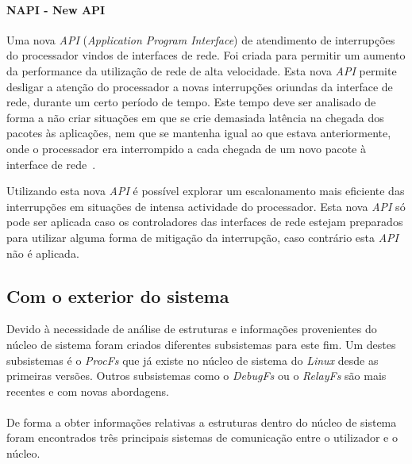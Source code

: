 \paragraph*{NAPI - New API}\label{par:NAPI}

Uma nova \textit{API} (\textit{Application Program Interface}) de atendimento de interrupções do processador vindos de interfaces de rede. Foi criada para permitir um aumento da performance da utilização de rede de alta velocidade. Esta nova \textit{API} permite desligar a atenção do processador a novas interrupções oriundas da interface de rede, durante um certo período de tempo. Este tempo deve ser analisado de forma a não criar situações em que se crie demasiada latência na chegada dos pacotes às aplicações, nem que se mantenha igual ao que estava anteriormente, onde o processador era interrompido a cada chegada de um novo pacote à interface de rede~\cite{administrator:napi}.

Utilizando esta nova \textit{API} é possível explorar um escalonamento mais eficiente das interrupções em situações de intensa actividade do processador. Esta nova \textit{API} só pode ser aplicada caso os controladores das interfaces de rede estejam preparados para utilizar alguma forma de mitigação da interrupção, caso contrário esta \textit{API} não é aplicada.

\subsection{Com o exterior do sistema}
% 

Devido à necessidade de análise de estruturas e informações provenientes do núcleo de sistema foram criados diferentes subsistemas para este fim. Um destes subsistemas é o \textit{ProcFs} que já existe no núcleo de sistema do \textit{Linux} desde as primeiras versões. Outros subsistemas como o \textit{DebugFs} ou o \textit{RelayFs} são mais recentes e com novas abordagens. 

\paragraph*{}
De forma a obter informações relativas a estruturas dentro do núcleo de sistema foram encontrados três principais sistemas de comunicação entre o utilizador e o núcleo.

